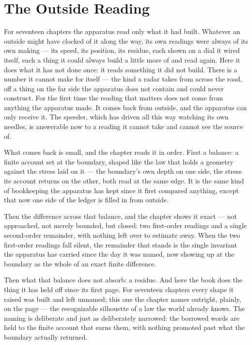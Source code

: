 \chapter{The Outside Reading}

For seventeen chapters the apparatus read only what it had built. Whatever an outside might have clocked of it along the way, its own readings were always of its own making --- its speed, its position, its residue, each shown on a dial it wired itself, each a thing it could always build a little more of and read again. Here it does what it has not done once: it reads something it did not build. There is a number it cannot make for itself --- the kind a radar takes from across the road, off a thing on the far side the apparatus does not contain and could never construct. For the first time the reading that matters does not come from anything the apparatus made. It comes back from outside, and the apparatus can only receive it. The speeder, which has driven all this way watching its own needles, is answerable now to a reading it cannot take and cannot see the source of.

What comes back is small, and the chapter reads it in order. First a balance: a finite account set at the boundary, shaped like the law that holds a geometry against the stress laid on it --- the boundary's own depth on one side, the stress its account returns on the other, both read at the same edge. It is the same kind of bookkeeping the apparatus has kept since it first compared anything, except that now one side of the ledger is filled in from outside.

Then the difference across that balance, and the chapter shows it exact --- not approached, not merely bounded, but closed: two first-order readings and a single second-order remainder, with nothing left over to estimate away. When the two first-order readings fall silent, the remainder that stands is the single invariant the apparatus has carried since the day it was named, now showing up at the boundary as the whole of an exact finite difference.

Then what that balance does not absorb: a residue. And here the book does the thing it has held off since its first page. For seventeen chapters every shape it raised was built and left unnamed; this one the chapter names outright, plainly, on the page --- the recognizable silhouette of a law the world already knows. The naming is deliberate and just as deliberately narrowed: the borrowed words are held to the finite account that earns them, with nothing promoted past what the boundary actually returned.

